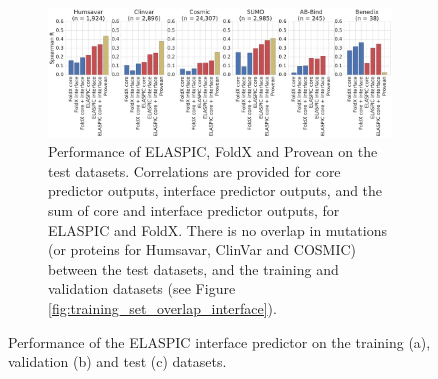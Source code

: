 \begin{figure}[tb]
\begin{subfigure}[b]{1.0\textwidth}
{		}
		\label{fig:validation_performance_interface}
		\vspace*{10mm}
	\end{subfigure}
	\begin{subfigure}[b]{1.0\textwidth}
		\centering
		\includegraphics[width=1.0\textwidth]{static/elaspic_training_set/validation/test_performance_interface.pdf}
		\caption{
			Performance of ELASPIC, FoldX and Provean on the test datasets.
			Correlations are provided for core predictor outputs, interface predictor outputs, and the sum of core and interface predictor outputs, for ELASPIC and FoldX.
			There is no overlap in mutations (or proteins for Humsavar, ClinVar and COSMIC) between the test datasets,
			and the training and validation datasets (see Figure \ref{fig:training_set_overlap_interface}).
		}
		\label{fig:test_performance_interface}
		\vspace*{5mm}
	\end{subfigure}
	\caption[Interface predictor validation.]{Performance of the ELASPIC interface predictor on the training (a), validation (b) and test (c) datasets.}
	\label{fig:interface_validation}
\end{figure}
